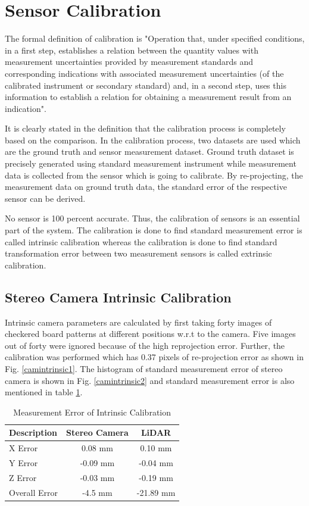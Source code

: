 \section{Sensor Calibration}
The formal definition of calibration is "Operation that, under specified conditions, in a first step, establishes a relation between the quantity values with measurement uncertainties provided by measurement standards and corresponding indications with associated measurement uncertainties (of the calibrated instrument or secondary standard) and, in a second step, uses this information to establish a relation for obtaining a measurement result from an indication"\cite{calibration}.

It is clearly stated in the definition that the calibration process is completely based on the comparison. In the calibration process, two datasets are used which are the ground truth and sensor measurement dataset. Ground truth dataset is precisely generated using standard measurement instrument while measurement data is collected from the sensor which is going to calibrate. By re-projecting, the measurement data on ground truth data, the standard error of the respective sensor can be derived.     

No sensor is 100 percent accurate. Thus, the calibration of sensors is an essential part of the system. The calibration is done to find standard measurement error is called intrinsic calibration whereas the calibration is done to find standard transformation error between two measurement sensors is called extrinsic calibration.

\subsection{Stereo Camera Intrinsic Calibration}
Intrinsic camera parameters are calculated by first taking forty images of checkered board patterns at different positions w.r.t to the camera. Five images out of forty were ignored because of the high reprojection error. Further, the calibration was performed which has 0.37 pixels of re-projection error as shown in Fig. \ref{camintrinsic1}. The histogram of standard measurement error of stereo camera is shown in Fig. \ref{camintrinsic2} and standard measurement error is also mentioned in table \ref{Intrinsics}.      

\begin{table}
    \centering
    \begin{tabular}{|l|c|c|}
        \hline
        Description & Stereo Camera & LiDAR \\
        \hline
        X Error & 0.08 mm & 0.10 mm \\
        \hline
        Y Error & -0.09 mm & -0.04 mm \\ 
        \hline
        Z Error & -0.03 mm  & -0.19 mm \\
        \hline
        Overall Error & -4.5 mm & -21.89 mm \\
        \hline
    \end{tabular}
    \caption{Measurement Error of Intrinsic Calibration}
    \label{Intrinsics}
\end{table}


